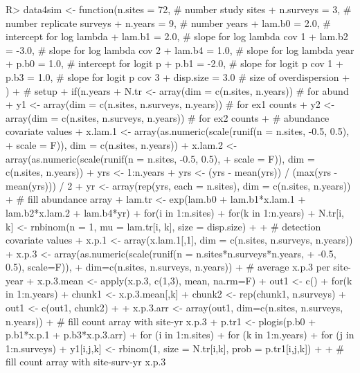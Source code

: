 \documentclass[article]{jss}
\begin{document}
\begin{CodeInput}
R> data4sim <- function(n.sites = 72,   # number study sites
+                       n.surveys = 3,  # number replicate surveys
+                       n.years = 9,    # number years
+                       lam.b0 = 2.0,   # intercept for log lambda
+                       lam.b1 = 2.0,   # slope for log lambda cov 1
+                       lam.b2 = -3.0,  # slope for log lambda cov 2
+                       lam.b4 = 1.0,   # slope for log lambda year
+                       p.b0 = 1.0,     # intercept for logit p
+                       p.b1 = -2.0,    # slope for logit p cov 1
+                       p.b3 = 1.0,     # slope for logit p cov 3
+                       disp.size = 3.0 # size of overdispersion
+                       ){
+  # setup
+  if(n.years %
+  N.tr <- array(dim = c(n.sites, n.years))           # for abund
+  y1 <- array(dim = c(n.sites, n.surveys, n.years))  # for ex1 counts
+  y2 <- array(dim = c(n.sites, n.surveys, n.years))  # for ex2 counts
+  # abundance covariate values
+  x.lam.1 <- array(as.numeric(scale(runif(n = n.sites, -0.5, 0.5), 
+                   scale = F)), dim = c(n.sites, n.years))
+  x.lam.2 <- array(as.numeric(scale(runif(n = n.sites, -0.5, 0.5), 
+                   scale = F)), dim = c(n.sites, n.years))
+  yrs <- 1:n.years
+  yrs <- (yrs - mean(yrs)) / (max(yrs - mean(yrs))) / 2
+  yr <- array(rep(yrs, each = n.sites), dim = c(n.sites, n.years))
+  # fill abundance array
+  lam.tr <- exp(lam.b0 + lam.b1*x.lam.1 + lam.b2*x.lam.2 + lam.b4*yr)
+  for(i in 1:n.sites){
+    for(k in 1:n.years){
+    N.tr[i, k] <- rnbinom(n = 1, mu = lam.tr[i, k], size = disp.size)
+  }}
+  # detection covariate values
+  x.p.1 <- array(x.lam.1[,1], dim = c(n.sites, n.surveys, n.years))
+  x.p.3 <- array(as.numeric(scale(runif(n = n.sites*n.surveys*n.years, 
+                                        -0.5, 0.5), scale=F)), 
+                 dim=c(n.sites, n.surveys, n.years))
+  # average x.p.3 per site-year
+  x.p.3.mean <- apply(x.p.3, c(1,3), mean, na.rm=F)
+  out1 <- c()
+  for(k in 1:n.years){
+   chunk1 <- x.p.3.mean[,k]
+   chunk2 <- rep(chunk1, n.surveys)
+   out1 <- c(out1, chunk2)
+  }
+  x.p.3.arr <- array(out1, dim=c(n.sites, n.surveys, n.years))
+  # fill count array with site-yr x.p.3
+  p.tr1 <- plogis(p.b0 + p.b1*x.p.1 + p.b3*x.p.3.arr)
+  for (i in 1:n.sites){
+    for (k in 1:n.years){
+      for (j in 1:n.surveys){
+        y1[i,j,k] <- rbinom(1, size = N.tr[i,k], prob = p.tr1[i,j,k])
+  }}}
+  # fill count array with site-surv-yr x.p.3
}
\end{CodeInput}
\end{document}
